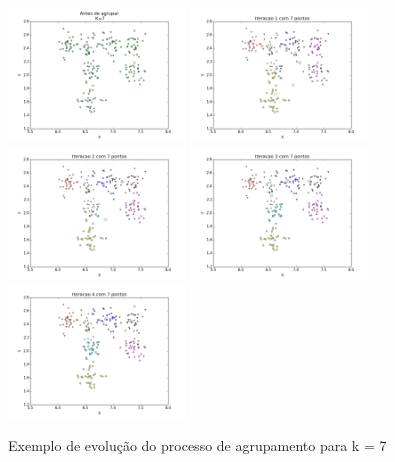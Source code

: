 \documentclass[12pt, a4paper]{article}
\begin{document}
\begin{landscape}
\begin{figure}[!ht]
\label{k=7}
  \caption{Exemplo de evolução do processo de agrupamento para k = 7}
  \centering
    \includegraphics[width=0.42\textwidth]{antes_k7.png}
    \includegraphics[width=0.42\textwidth]{depois_1.png}
    \includegraphics[width=0.42\textwidth]{depois_2.png}
    \includegraphics[width=0.42\textwidth]{depois_3.png}
    \includegraphics[width=0.42\textwidth]{depois_4.png}

\end{figure}
\end{landscape}
\end{document}
